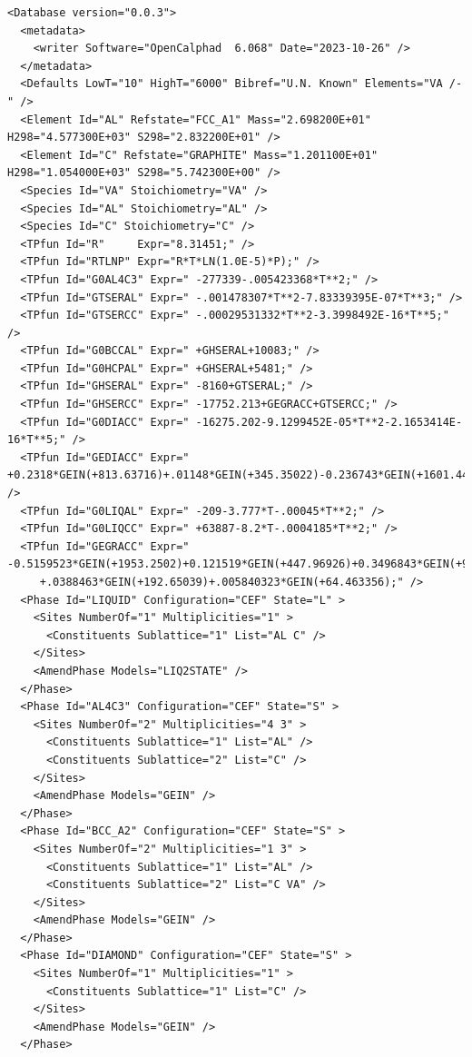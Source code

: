 \documentclass{article}
\begin{document}
\begin{appendices}
{\small
\begin{verbatim}
<Database version="0.0.3">
  <metadata>
    <writer Software="OpenCalphad  6.068" Date="2023-10-26" />
  </metadata>
  <Defaults LowT="10" HighT="6000" Bibref="U.N. Known" Elements="VA /-" />
  <Element Id="AL" Refstate="FCC_A1" Mass="2.698200E+01" H298="4.577300E+03" S298="2.832200E+01" />
  <Element Id="C" Refstate="GRAPHITE" Mass="1.201100E+01" H298="1.054000E+03" S298="5.742300E+00" />
  <Species Id="VA" Stoichiometry="VA" />
  <Species Id="AL" Stoichiometry="AL" />
  <Species Id="C" Stoichiometry="C" />
  <TPfun Id="R"     Expr="8.31451;" />
  <TPfun Id="RTLNP" Expr="R*T*LN(1.0E-5)*P);" />
  <TPfun Id="G0AL4C3" Expr=" -277339-.005423368*T**2;" /> 
  <TPfun Id="GTSERAL" Expr=" -.001478307*T**2-7.83339395E-07*T**3;" /> 
  <TPfun Id="GTSERCC" Expr=" -.00029531332*T**2-3.3998492E-16*T**5;" /> 
  <TPfun Id="G0BCCAL" Expr=" +GHSERAL+10083;" /> 
  <TPfun Id="G0HCPAL" Expr=" +GHSERAL+5481;" /> 
  <TPfun Id="GHSERAL" Expr=" -8160+GTSERAL;" /> 
  <TPfun Id="GHSERCC" Expr=" -17752.213+GEGRACC+GTSERCC;" /> 
  <TPfun Id="G0DIACC" Expr=" -16275.202-9.1299452E-05*T**2-2.1653414E-16*T**5;" /> 
  <TPfun Id="GEDIACC" Expr=" +0.2318*GEIN(+813.63716)+.01148*GEIN(+345.35022)-0.236743*GEIN(+1601.4467);" /> 
  <TPfun Id="G0LIQAL" Expr=" -209-3.777*T-.00045*T**2;" /> 
  <TPfun Id="G0LIQCC" Expr=" +63887-8.2*T-.0004185*T**2;" /> 
  <TPfun Id="GEGRACC" Expr=" -0.5159523*GEIN(+1953.2502)+0.121519*GEIN(+447.96926)+0.3496843*GEIN(+947.01605)
     +.0388463*GEIN(+192.65039)+.005840323*GEIN(+64.463356);" /> 
  <Phase Id="LIQUID" Configuration="CEF" State="L" >
    <Sites NumberOf="1" Multiplicities="1" >
      <Constituents Sublattice="1" List="AL C" />
    </Sites>
    <AmendPhase Models="LIQ2STATE" />
  </Phase>
  <Phase Id="AL4C3" Configuration="CEF" State="S" >
    <Sites NumberOf="2" Multiplicities="4 3" >
      <Constituents Sublattice="1" List="AL" />
      <Constituents Sublattice="2" List="C" />
    </Sites>
    <AmendPhase Models="GEIN" />
  </Phase>
  <Phase Id="BCC_A2" Configuration="CEF" State="S" >
    <Sites NumberOf="2" Multiplicities="1 3" >
      <Constituents Sublattice="1" List="AL" />
      <Constituents Sublattice="2" List="C VA" />
    </Sites>
    <AmendPhase Models="GEIN" />
  </Phase>
  <Phase Id="DIAMOND" Configuration="CEF" State="S" >
    <Sites NumberOf="1" Multiplicities="1" >
      <Constituents Sublattice="1" List="C" />
    </Sites>
    <AmendPhase Models="GEIN" />
  </Phase>



\end{verbatim}}
\end{appendices}
\end{document}

